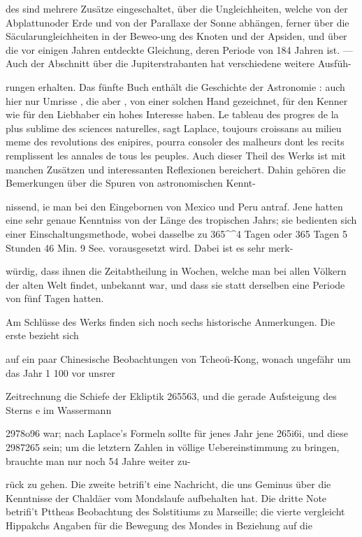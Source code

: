 \documentclass[10pt,a4paper]{article}
\begin{document}
des sind mehrere Zusätze eingeschaltet, über die Ungleichheiten, welche von der Abplattunoder Erde und von der Parallaxe der Sonne abhängen, ferner über die Säcularungleichheiten in der Beweo-ung des Knoten und der Apsiden, und über die vor einigen Jahren entdeckte Gleichung, deren Periode von 184 Jahren ist. — Auch der Abschnitt über die Jupiterstrabanten hat verschiedene weitere Ausfüh-

rungen erhalten. Das fünfte Buch enthält die Geschichte der Astronomie : auch hier nur Umrisse , die aber , von einer solchen Hand gezeichnet, für den Kenner wie für den Liebhaber ein hohes Interesse haben. Le tableau des progres de la plus sublime des sciences naturelles, sagt Laplace, toujours croissans au milieu meme des revolutions des enipires, pourra consoler des malheurs dont les recits remplissent les annales de tous les peuples. Auch dieser Theil des Werks ist mit manchen Zusätzen und interessanten Reflexionen bereichert. Dahin gehören die Bemerkungen über die Spuren von astronomischen Kennt-

nissend, ie man bei den Eingebornen von Mexico und Peru antraf. Jene hatten eine sehr genaue Kenntniss von der Länge des tropischen Jahrs; sie bedienten sich einer Einschaltungsmethode, wobei dasselbe zu 365\textasciicircum{}\textasciicircum{}4 Tagen oder 365 Tagen 5 Stunden 46 Min. 9 See. vorausgesetzt wird. Dabei ist es sehr merk-

würdig, dass ihnen die Zeitabtheilung in Wochen, welche man bei allen Völkern der alten Welt findet, unbekannt war, und dass sie statt derselben eine Periode von fünf Tagen hatten.

Am Schlüsse des Werks finden sich noch sechs historische Anmerkungen. Die erste bezieht sich

auf ein paar Chinesische Beobachtungen von Tcheoü-Kong, wonach ungefähr um das Jahr 1 100 vor unsrer

Zeitrechnung die Schiefe der Ekliptik 26\textdegree{}5563, und die gerade Aufsteigung des Sterns e im Wassermann

297\textdegree{}8o96 war; nach Laplace's Formeln sollte für jenes Jahr jene 26\textdegree{}5i6i, und diese 298\textdegree{}7265 sein; um die letztern Zahlen in völlige Uebereinstimmung zu bringen, brauchte man nur noch 54 Jahre weiter zu-

rück zu gehen. Die zweite betrifi't eine Nachricht, die uns Geminus über die Kenntnisse der Chaldäer vom Mondslaufe aufbehalten hat. Die dritte Note betrifi't Pttheas Beobachtung des Solstitiums zu Marseille; die vierte vergleicht Hippakchs Angaben für die Bewegung des Mondes in Beziehung auf die
\end{document}
